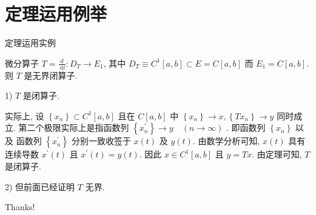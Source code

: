 \documentclass[sans,mathserif]{beamer} %
\begin{document}
\section{定理运用例举}
\begin{frame}{定理运用实例}
	\begin{example}[闭图像定理运用]
		微分算子 $ T=\frac{d}{\mathrm{~d} t}: D_{T} \rightarrow E_{1}$,  其中 $ D_{T} \equiv C^{1}[a, b] \subset E=C[a, b]$
而 $ E_{1}=C[a, b] $.  则 $ T $ 是无界闭算子.

1) $ T $ 是闭算子.

实际上, 设 $ \left\{x_{n}\right\} \subset C^{1}[a, b] $ 且在 $ C[a, b] $ 中 $ \left\{x_{n}\right\} \rightarrow x,\left\{T x_{n}\right\} \rightarrow y $ 同时成立.
第二个极限实际上是指函数列 $ \left\{x_{n}^{\prime}\right\} \rightarrow y \quad(n \rightarrow \infty)$ .  即函数列  $\left\{x_{n}\right\} $ 以及
函数列 $ \left\{x_{n}^{\prime}\right\} $ 分别一致收签于 $ x(t) $ 及 $ y(t) $.
由数学分析可知, $ x(t) $ 具有连续导数 $ x^{\prime}(t)$  且  $x^{\prime}(t)=y(t) $.
因此 $ x \in C^{1}[a, b]$  且 $ y=T x $.  由定理可知, $ T $ 是闭算子.

2) 但前面已经证明 $ T $ 无界.
	\end{example}
\end{frame}

\begin{frame}
\begin{center}
{\Huge\calligra Thanks!}
\end{center}
\end{frame}
\end{document}
